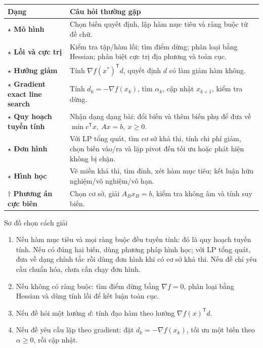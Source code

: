 \documentclass[11pt,a4paper]{article}
\newcommand{\grad}{\nabla}
\newcommand{\T}{^{\mathsf T}}
\begin{document}
\begin{center}
\begin{tabularx}{.96\textwidth}{>{\bfseries}p{}Y}
\toprule
Dạng & Câu hỏi thường gặp\\
\midrule
\(\star\) Mô hình & Chọn biến quyết định, lập hàm mục tiêu và ràng buộc từ đề chữ.\\
\(\star\) Lồi và cực trị & Kiểm tra tập/hàm lồi; tìm điểm dừng; phân loại bằng Hessian; phân biệt cực trị địa phương và toàn cục.\\
\(\star\) Hướng giảm & Tính \(\grad f(x^\ast)\T d\), quyết định \(d\) có làm giảm hàm không.\\
\(\star\) Gradient exact line search & Tính \(d_k=-\grad f(x_k)\), tìm \(\alpha_k\), cập nhật \(x_{k+1}\), kiểm tra dừng.\\
\(\star\) Quy hoạch tuyến tính & Nhận dạng dạng bài; đổi biến và thêm biến phụ để đưa về \(\min c\T x,\ Ax=b,\ x\ge0\).\\
\(\star\) Đơn hình & Với LP tổng quát, tìm cơ sở khả thi, tính chi phí giảm, chọn biến vào/ra và lặp pivot đến tối ưu hoặc phát hiện không bị chặn.\\
\(\star\) Hình học & Vẽ miền khả thi, tìm đỉnh, xét hàm mục tiêu; kết luận hữu nghiệm/vô nghiệm/vô hạn.\\
\(\dagger\) Phương án cực biên & Chọn cơ sở, giải \(A_Bx_B=b\), kiểm tra không âm và tính suy biến.\\
\bottomrule
\end{tabularx}
\end{center}

\begin{keybox}{Sơ đồ chọn cách giải}
\begin{enumerate}
\item Nếu hàm mục tiêu và mọi ràng buộc đều tuyến tính: đó là quy hoạch tuyến tính. Nếu có đúng hai biến, dùng phương pháp hình học; với LP tổng quát, đưa về dạng chính tắc rồi dùng đơn hình khi có cơ sở khả thi. Nếu đề chỉ yêu cầu chuẩn hóa, chưa cần chạy đơn hình.
\item Nếu không có ràng buộc: tìm điểm dừng bằng \(\grad f=0\), phân loại bằng Hessian và dùng tính lồi để kết luận toàn cục.
\item Nếu đề hỏi một hướng \(d\): tính đạo hàm theo hướng \(\grad f(x)\T d\).
\item Nếu đề yêu cầu lặp theo gradient: đặt \(d_k=-\grad f(x_k)\), tối ưu một biến theo \(\alpha\ge0\), rồi cập nhật.
\end{enumerate}
\end{keybox}
\end{document}
